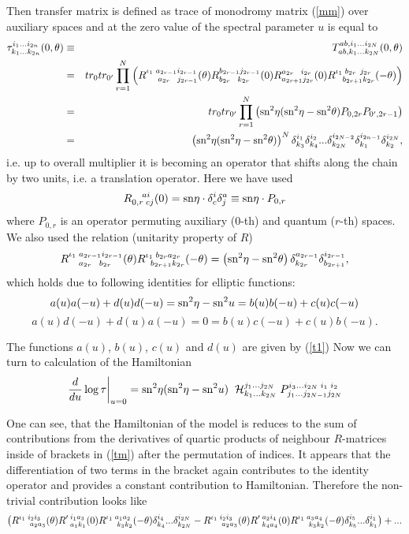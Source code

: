 \documentclass[a4paper,11pt]{article}
\def\sn{{\rm{sn}}}
\begin{document}
Then transfer matrix is defined as trace of monodromy matrix 
(\ref{mm}) over auxiliary spaces and at the zero value of
the spectral parameter $u$ is equal to
\begin{eqnarray}
\tau^{i_1...i_{2n}}_{k_1...k_{2n}}(0,\theta) &\equiv&
T^{ab,i_1...i_{2N}}_{ab,k_1...k_{2N}}(0,\theta) \\
\label{tm}
&=&
tr_0tr_{0^\prime}\prod^N_{r=1}\left(R^{\iota_1\; a_{2r-1}i_{2r-1}}_
{\;\;\;\;\; a_{2r}\;\;\; j_{2r-1}}(\theta)R^{b_{2r-1}j_{2r-1}}_
{b_{2r}\;\;\; k_{2r}}(0)R^{a_{2r}\;\;\; i_{2r}}_{a_{2r+1}j_{2r}}
(0)R^{\iota_1\; b_{2r}\;\, j_{2r}}_{\;\;\; b_{2r+1}k_{2r}}(-\theta)
\right)
\\
&=&
tr_0tr_{0^\prime}\prod^N_{r=1}\left(\sn^2\eta(\sn^2\eta-\sn^2
\theta)P_{0,2r}P_{0^\prime,2r-1}\right)
\\
&=&
\left(\sn^2\eta(\sn^2\eta-\sn^2\theta)\right)^N
\delta^{i_1}_{k_3}\delta^{i_2}_{k_4}...\delta^{i_{2N-2}}_{k_{2N}}
\delta^{i_{2n-1}}_{k_1}\delta^{i_{2N}}_{k_2},
\end{eqnarray}
i.e. up to overall multiplier it is becoming an operator that shifts
along the chain by two units, i.e. a translation operator. Here we
have used 
$$
R^{\;\;\;\; ai}_{0,r\;cj}(0)=\sn\eta\cdot\delta^i_c\delta^a_j
\equiv \sn\eta\cdot P_{0,r}
$$
where $P_{0,r}$ is an operator permuting auxiliary ($0$-th) and quantum 
($r$-th) spaces. We also used the relation (unitarity property of $R$)
$$
R^{\iota_1\;a_{2r-1}i_{2r-1}}_{\;\;\;\; a_{2r}\;\;\;b_{2r}}(\theta)
R^{\iota_1\;b_{2r}a_{2r}}_{\;\; b_{2r+1}k_{2r}}(-\theta)=
\left(\sn^2\eta-\sn^2\theta\right)\delta^{a_{2r-1}}_{k_{2r}}
\delta^{i_{2r-1}}_{b_{2r+1}},
$$
which holds due to following identities for elliptic functions:
$$
a(u)a(-u)+d(u)d(-u)=\sn^2\eta-\sn^2u=b(u)b(-u)+c(u)c(-u)
$$
$$
a(u)d(-u)+d(u)a(-u)=0=b(u)c(-u)+c(u)b(-u).
$$

The functions $a(u)$, $b(u)$, $c(u)$ and $d(u)$ are given by (\ref{t1})
Now we can turn to calculation of the Hamiltonian
\begin{equation}
\label{ham}
\left.\frac{d}{du}\log\tau \right|_{u=0}=\sn^2\eta(\sn^2\eta-\sn^2u) \;\;
\cH^{j_1...j_{2N}}_{k_1...k_{2N}} 
\; P^{i_3...i_{2N}\; i_1\;i_2}_{j_1...j_{2N-1}j_{2N}} 
\end{equation}

One can see, that the Hamiltonian of the model is reduces to the sum of
contributions from the derivatives of quartic products 
of neighbour $R$-matrices inside of 
brackets in (\ref{tm}) after the  permutation of indices. 
It appears that the differentiation of two 
terms in the bracket again contributes to the identity operator and
provides a constant contribution to Hamiltonian. 
Therefore the non-trivial contribution looks like
\begin{equation}
\label{ham1}
\left(R^{\iota_1\;i_2i_3}_{\;\;\;\;\; a_2a_3}(\theta)R^{\prime\;i_1
a_3}_{\;\;a_1k_1}(0)R^{\iota_1\;a_1a_2}_{\;\;\;\;\; k_3k_2}(-\theta)
\delta^{i_4}_{k_4}...\delta^{i_{2N}}_{k_{2N}}-R^{\iota_1\;i_2i_3}_
{\;\;\;\;\; a_2a_3}(\theta)R^{\prime\;a_2i_4}_{\;\;k_4a_4}(0)R^
{\iota_1\;a_3a_4}_{\;\;\;\;\; k_3k_2}(-\theta)\delta^{i_5}_{k_5}...
\delta^{i_1}_{k_1}\right)+...\nonumber\\
\end{equation}
\end{document}
